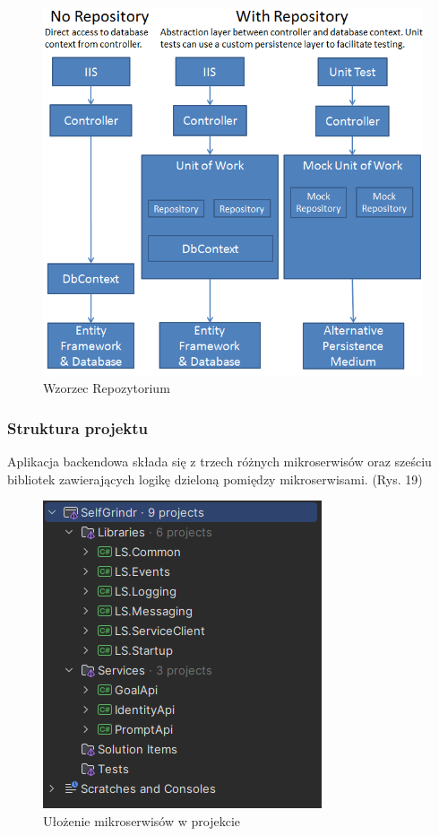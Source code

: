 \begin{figure}[H]
    \centering
    \includegraphics[width=1\linewidth]{Obrazy/repository.png}
    \caption{Wzorzec Repozytorium}
    \label{fig:enter-label}
\end{figure}

\subsubsection{Struktura projektu}
Aplikacja backendowa składa się z trzech różnych mikroserwisów oraz sześciu bibliotek zawierających logikę dzieloną pomiędzy mikroserwisami. (Rys. 19)

\begin{figure}[H]
    \centering
    \includegraphics[width=0.5\linewidth]{Obrazy/BackendStruktura.png}
    \caption{Ułożenie mikroserwisów w projekcie}
    \label{fig:enter-label}
\end{figure}

